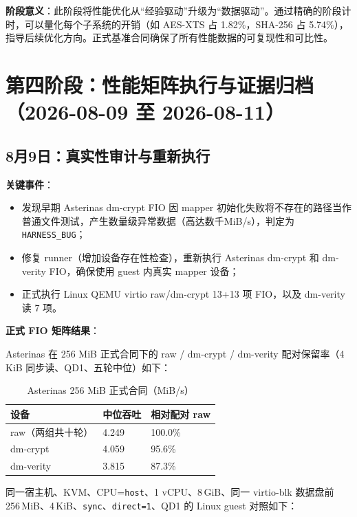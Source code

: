 \textbf{阶段意义}：此阶段将性能优化从“经验驱动”升级为“数据驱动”。通过精确的阶段计时，可以量化每个子系统的开销（如 AES-XTS 占 1.82\%，SHA-256 占 5.74\%），指导后续优化方向。正式基准合同确保了所有性能数据的可复现性和可比性。

\section{第四阶段：性能矩阵执行与证据归档（2026-08-09 至 2026-08-11）}

\subsection{8月9日：真实性审计与重新执行}

\textbf{关键事件}：
\begin{itemize}
    \item 发现早期 Asterinas dm-crypt FIO 因 mapper 初始化失败将不存在的路径当作普通文件测试，产生数量级异常数据（高达数千MiB/s），判定为 \texttt{HARNESS\_BUG}；
    \item 修复 runner（增加设备存在性检查），重新执行 Asterinas dm-crypt 和 dm-verity FIO，确保使用 guest 内真实 mapper 设备；
    \item 正式执行 Linux QEMU virtio raw/dm-crypt 13+13 项 FIO，以及 dm-verity 读 7 项。
\end{itemize}

\textbf{正式 FIO 矩阵结果}：

Asterinas 在 256 MiB 正式合同下的 raw / dm-crypt / dm-verity 配对保留率（4 KiB 同步读、QD1、五轮中位）如下：

\begin{table}[H]
    \centering
    \caption{Asterinas 256 MiB 正式合同（MiB/s）}
    \begin{tabular}{p{}p{}p{}}
        \toprule
        \textbf{设备} & \textbf{中位吞吐} & \textbf{相对配对 raw} \\
        \midrule
        raw（两组共十轮） & 4.249 & 100.0\% \\
        dm-crypt & 4.059 & 95.6\% \\
        dm-verity & 3.815 & 87.3\% \\
        \bottomrule
    \end{tabular}
\end{table}

同一宿主机、KVM、CPU=\texttt{host}、1 vCPU、8\,GiB、同一 virtio-blk 数据盘前 256\,MiB、4\,KiB、\texttt{sync}、\texttt{direct=1}、QD1 的 Linux guest 对照如下：

